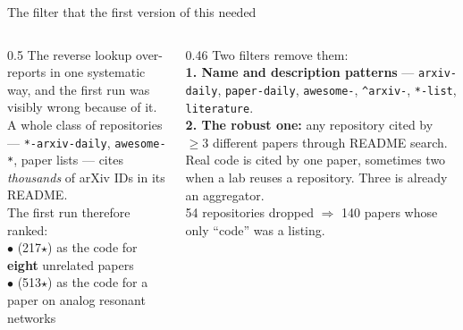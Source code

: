 \documentclass[aspectratio=169,10pt]{beamer}
\begin{document}
\begin{frame}{The filter that the first version of this needed}
  \begin{columns}[T]
    \begin{column}{0.5\textwidth}
      \small
      The reverse lookup over-reports in one systematic way, and the first run
      was visibly wrong because of it.
      \\[2mm]
      A whole class of repositories --- \texttt{*-arxiv-daily},
      \texttt{awesome-*}, paper lists --- cites \emph{thousands} of arXiv IDs in
      its README.
      \\[2mm]
      The first run therefore ranked:
      \\[1mm]
      \scriptsize
      $\bullet$  (217$\star$) as the code for
      \textbf{eight} unrelated papers\\[1mm]
      $\bullet$  (513$\star$) as the code for a
      paper on analog resonant networks
    \end{column}
    \begin{column}{0.46\textwidth}
      \small
      Two filters remove them:
      \\[2mm]
      \textbf{1. Name and description patterns} ---
      \texttt{arxiv-daily}, \texttt{paper-daily}, \texttt{awesome-},
      \texttt{\^{}arxiv-}, \texttt{*-list}, \texttt{literature}.
      \\[2mm]
      \textbf{2. The robust one:} any repository cited by $\ge 3$ different
      papers through README search. Real code is cited by one paper, sometimes
      two when a lab reuses a repository. Three is already an aggregator.
      \\[2.5mm]
      \scriptsize\color{pdmink2}
      54 repositories dropped $\Rightarrow$ 140 papers whose only ``code'' was
      a listing.
    \end{column}
  \end{columns}
\end{frame}
\end{document}
